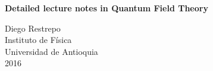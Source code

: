 \documentclass[12pt,letterpaper]{book}
\theoremstyle{example}
\newcommand{\tofc}[1]{#1} %
\begin{document}
\renewcommand{\thepage}{\roman{page}}
\begin{titlepage}
  \begin{center}

    
\textbf{\huge    Detailed lecture notes in Quantum Field Theory}

    

\vspace{4cm}
 Diego Restrepo\\
Instituto de Física\\
Universidad de Antioquia\\
2016
    
  \end{center}
\end{titlepage}





\tofc{
\renewcommand{\thepage}{\roman{page}}
\tableofcontents{}

\newpage{}
}

\renewcommand{\thepage}{\arabic{page}}
\setcounter{page}{1}


%





%








\appendix








\end{document}
